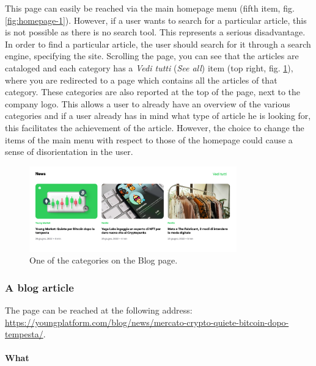This page can easily be reached via the main homepage menu (fifth item, 
fig. \ref{fig:homepage-1}). However, if a user wants to search for a 
particular article, this is not possible as there is no search tool. This 
represents a serious disadvantage. In order to find a particular article, 
the user should search for it through a search engine, specifying the 
site. Scrolling the page, you can see that the articles are cataloged and 
each category has a \textit{Vedi tutti} (\textit{See all}) item (top right, 
fig. \ref{fig:blog-2}), where you are redirected to a page which contains 
all the articles of that category. These categories are also reported at the 
top of the page, next to the company logo. This allows a user to already 
have an overview of the various categories and if a user already has in 
mind what type of article he is looking for, this facilitates the 
achievement of the article. However, the choice to change the items of the 
main menu with respect to those of the homepage could cause a sense of 
disorientation in the user.

\begin{figure}[H]
  \centering
  \includegraphics[width=0.80\textwidth]{res/images/internal-pages/blog/blog-2.png}
  \caption{One of the categories on the Blog page.}
  \label{fig:blog-2}
\end{figure}

\subsubsection{A blog article}

The page can be reached at the following address: \\
\href{https://youngplatform.com/blog/news/mercato-crypto-quiete-bitcoin-dopo-tempesta/}{https://youngplatform.com/blog/news/mercato-crypto-quiete-bitcoin-dopo-tempesta/}.

\paragraph{What}

